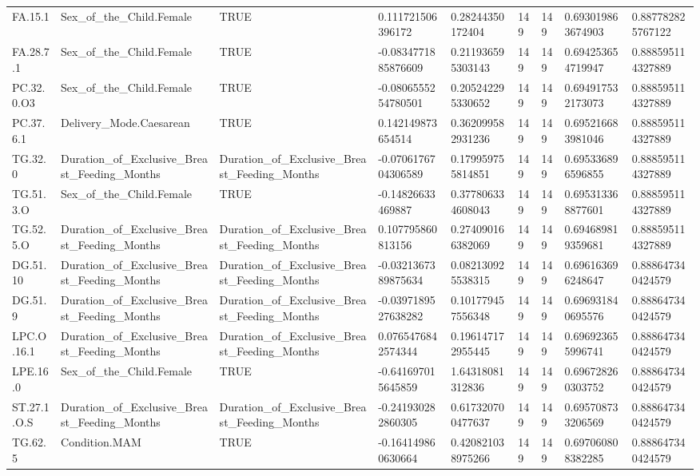 \begin{longtable}{lllllllll}
FA.15.1 & Sex\_of\_the\_Child.Female & TRUE & 0.111721506396172 & 0.28244350172404 & 149 & 149 & 0.693019863674903 & 0.887782825767122 \\
FA.28.7.1 & Sex\_of\_the\_Child.Female & TRUE & -0.0834771885876609 & 0.211936595303143 & 149 & 149 & 0.694253654719947 & 0.888595114327889 \\
PC.32.0.O3 & Sex\_of\_the\_Child.Female & TRUE & -0.0806555254780501 & 0.205242295330652 & 149 & 149 & 0.694917532173073 & 0.888595114327889 \\
PC.37.6.1 & Delivery\_Mode.Caesarean & TRUE & 0.142149873654514 & 0.362099582931236 & 149 & 149 & 0.695216683981046 & 0.888595114327889 \\
TG.32.0 & Duration\_of\_Exclusive\_Breast\_Feeding\_Months & Duration\_of\_Exclusive\_Breast\_Feeding\_Months & -0.0706176704306589 & 0.179959755814851 & 149 & 149 & 0.695336896596855 & 0.888595114327889 \\
TG.51.3.O & Sex\_of\_the\_Child.Female & TRUE & -0.14826633469887 & 0.377806334608043 & 149 & 149 & 0.695313368877601 & 0.888595114327889 \\
TG.52.5.O & Duration\_of\_Exclusive\_Breast\_Feeding\_Months & Duration\_of\_Exclusive\_Breast\_Feeding\_Months & 0.107795860813156 & 0.274090166382069 & 149 & 149 & 0.694689819359681 & 0.888595114327889 \\
DG.51.10 & Duration\_of\_Exclusive\_Breast\_Feeding\_Months & Duration\_of\_Exclusive\_Breast\_Feeding\_Months & -0.0321367389875634 & 0.082130925538315 & 149 & 149 & 0.696163696248647 & 0.888647340424579 \\
DG.51.9 & Duration\_of\_Exclusive\_Breast\_Feeding\_Months & Duration\_of\_Exclusive\_Breast\_Feeding\_Months & -0.0397189527638282 & 0.101779457556348 & 149 & 149 & 0.696931840695576 & 0.888647340424579 \\
LPC.O.16.1 & Duration\_of\_Exclusive\_Breast\_Feeding\_Months & Duration\_of\_Exclusive\_Breast\_Feeding\_Months & 0.0765476842574344 & 0.196147172955445 & 149 & 149 & 0.696923655996741 & 0.888647340424579 \\
LPE.16.0 & Sex\_of\_the\_Child.Female & TRUE & -0.641697015645859 & 1.64318081312836 & 149 & 149 & 0.696728260303752 & 0.888647340424579 \\
ST.27.1.O.S & Duration\_of\_Exclusive\_Breast\_Feeding\_Months & Duration\_of\_Exclusive\_Breast\_Feeding\_Months & -0.241930282860305 & 0.617320700477637 & 149 & 149 & 0.695708733206569 & 0.888647340424579 \\
TG.62.5 & Condition.MAM & TRUE & -0.164149860630664 & 0.420821038975266 & 149 & 149 & 0.697060808382285 & 0.888647340424579 \\

\end{longtable}

